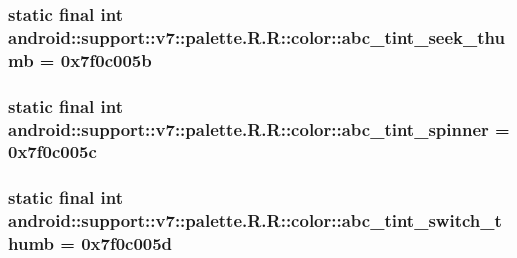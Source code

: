 \hypertarget{classandroid_1_1support_1_1v7_1_1palette_1_1_r_1_1color_6e96806527e9f979c5192df41474e06d}{
\subsubsection[{abc\_\-tint\_\-seek\_\-thumb}]{\setlength{\rightskip}{0pt plus 5cm}static final int android::support::v7::palette.R.R::color::abc\_\-tint\_\-seek\_\-thumb = 0x7f0c005b}}
\label{classandroid_1_1support_1_1v7_1_1palette_1_1_r_1_1color_6e96806527e9f979c5192df41474e06d}


\hypertarget{classandroid_1_1support_1_1v7_1_1palette_1_1_r_1_1color_51decf225d7fa138a468fdfceabbaf17}{
\subsubsection[{abc\_\-tint\_\-spinner}]{\setlength{\rightskip}{0pt plus 5cm}static final int android::support::v7::palette.R.R::color::abc\_\-tint\_\-spinner = 0x7f0c005c}}
\label{classandroid_1_1support_1_1v7_1_1palette_1_1_r_1_1color_51decf225d7fa138a468fdfceabbaf17}


\hypertarget{classandroid_1_1support_1_1v7_1_1palette_1_1_r_1_1color_b8a61e18c19b03bb6356cb4b7e4765ac}{
\subsubsection[{abc\_\-tint\_\-switch\_\-thumb}]{\setlength{\rightskip}{0pt plus 5cm}static final int android::support::v7::palette.R.R::color::abc\_\-tint\_\-switch\_\-thumb = 0x7f0c005d}}
\label{classandroid_1_1support_1_1v7_1_1palette_1_1_r_1_1color_b8a61e18c19b03bb6356cb4b7e4765ac}


